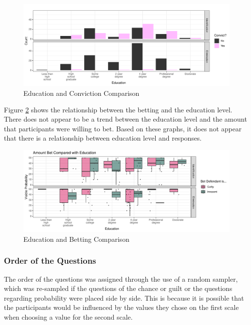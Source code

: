 \documentclass[print]{nuthesis}
\begin{document}
\begin{figure}

{\centering \includegraphics[width=\linewidth]{thesis_files/figure-latex/convictseduc-1} 

}

\caption{Education and Conviction Comparison}\label{fig:convictseduc}
\end{figure}

Figure \ref{fig:educbet} shows the relationship between the betting and the education level.
There does not appear to be a trend between the education level and the amount that participants were willing to bet.
Based on these graphs, it does not appear that there is a relationship between education level and responses.

\begin{figure}

{\centering \includegraphics[width=\linewidth]{thesis_files/figure-latex/educbet-1} 

}

\caption{Education and Betting Comparison}\label{fig:educbet}
\end{figure}

\hypertarget{order-of-the-questions}{%
\subsubsection{Order of the Questions}\label{order-of-the-questions}}

The order of the questions was assigned through the use of a random sampler, which was re-sampled if the questions of the chance or guilt or the questions regarding probability were placed side by side.
This is because it is possible that the participants would be influenced by the values they chose on the first scale when choosing a value for the second scale.
\end{document}
